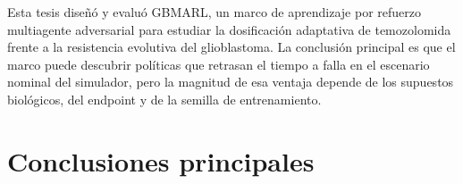 \label{cap:conclusiones}

Esta tesis diseñó y evaluó GBMARL, un marco de aprendizaje por refuerzo multiagente adversarial para estudiar la dosificación adaptativa de temozolomida frente a la resistencia evolutiva del glioblastoma. La conclusión principal es que el marco puede descubrir políticas que retrasan el tiempo a falla en el escenario nominal del simulador, pero la magnitud de esa ventaja depende de los supuestos biológicos, del endpoint y de la semilla de entrenamiento.

\section*{Conclusiones principales}
{}

